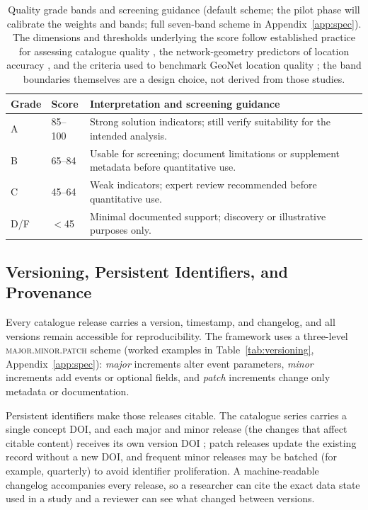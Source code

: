 \documentclass[11pt]{article}
\begin{document}
\begin{table}[H]
\centering
\small
\caption{Quality grade bands and screening guidance (default scheme; the pilot phase will calibrate the weights and bands; full seven-band scheme in Appendix~\ref{app:spec}). The dimensions and thresholds underlying the score follow established practice for assessing catalogue quality \citep{Woessner2005}, the network-geometry predictors of location accuracy \citep{Bondar2004}, and the criteria used to benchmark GeoNet location quality \citep{WarrenSmith2025}; the band boundaries themselves are a design choice, not derived from those studies.}
\label{tab:quality_grades}
\setlength{\tabcolsep}{5pt}
\renewcommand{\arraystretch}{1.15}
\begin{tabular}{p{1.6cm} p{2cm} p{8.4cm}}
\toprule
\textbf{Grade} & \textbf{Score} & \textbf{Interpretation and screening guidance} \\
\midrule
A & 85--100 & Strong solution indicators; still verify suitability for the intended analysis. \\
B & 65--84  & Usable for screening; document limitations or supplement metadata before quantitative use. \\
C & 45--64  & Weak indicators; expert review recommended before quantitative use. \\
D/F & $<$45 & Minimal documented support; discovery or illustrative purposes only. \\
\bottomrule
\end{tabular}
\end{table}

\subsection{Versioning, Persistent Identifiers, and Provenance}
Every catalogue release carries a version, timestamp, and changelog, and all versions remain accessible for reproducibility. The framework uses a three-level \textsc{major.minor.patch} scheme (worked examples in Table~\ref{tab:versioning}, Appendix~\ref{app:spec}): \emph{major} increments alter event parameters, \emph{minor} increments add events or optional fields, and \emph{patch} increments change only metadata or documentation.

Persistent identifiers make those releases citable. The catalogue series carries a single concept DOI, and each major and minor release (the changes that affect citable content) receives its own version DOI \citep{DataCiteVersioning}; patch releases update the existing record without a new DOI, and frequent minor releases may be batched (for example, quarterly) to avoid identifier proliferation. A machine-readable changelog accompanies every release, so a researcher can cite the exact data state used in a study and a reviewer can see what changed between versions.
\end{document}
